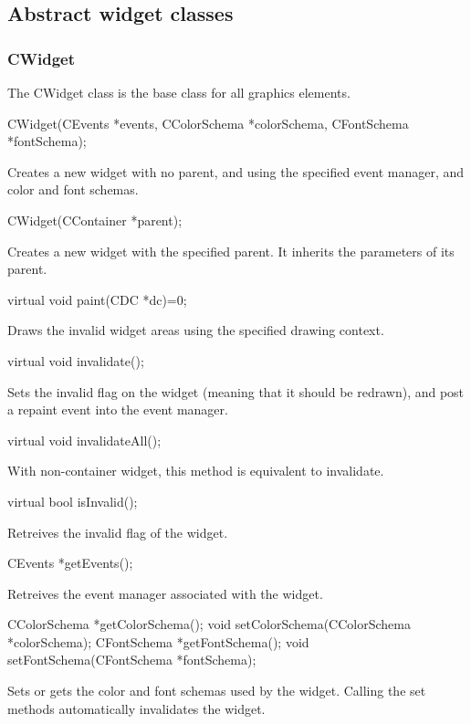 \documentclass[a4paper,11pt]{journal}
\begin{document}
\subsection{Abstract widget classes}
\subsubsection{CWidget}
The CWidget class is the base class for all graphics elements.\\
\begin{verbatimtab}CWidget(CEvents *events, CColorSchema *colorSchema, CFontSchema *fontSchema);\end{verbatimtab}
Creates a new widget with no parent, and using the specified event manager, and color and font schemas.\\
\begin{verbatimtab}CWidget(CContainer *parent);\end{verbatimtab}
Creates a new widget with the specified parent. It inherits the parameters of its parent.\\
\begin{verbatimtab}virtual void paint(CDC *dc)=0;\end{verbatimtab}
Draws the invalid widget areas using the specified drawing context.\\
\begin{verbatimtab}virtual void invalidate();\end{verbatimtab}
Sets the invalid flag on the widget (meaning that it should be redrawn), and post a repaint event into the event manager.\\
\begin{verbatimtab}virtual void invalidateAll();\end{verbatimtab}
With non-container widget, this method is equivalent to invalidate.\\
\begin{verbatimtab}virtual bool isInvalid();\end{verbatimtab}
Retreives the invalid flag of the widget.\\
\begin{verbatimtab}CEvents *getEvents();\end{verbatimtab}
Retreives the event manager associated with the widget.\\
\begin{verbatimtab}
CColorSchema *getColorSchema();
void setColorSchema(CColorSchema *colorSchema);
CFontSchema *getFontSchema();
void setFontSchema(CFontSchema *fontSchema);
\end{verbatimtab}
Sets or gets the color and font schemas used by the widget. Calling the set methods automatically invalidates the widget.
\end{document}
